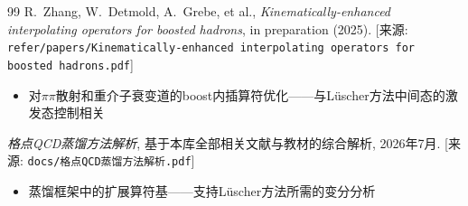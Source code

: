 \documentclass[12pt,a4paper]{ctexart}
\theoremstyle{definition}
\begin{document}
\begin{thebibliography}{99}
R.~Zhang, W.~Detmold, A.~Grebe, et al.,
\textit{Kinematically-enhanced interpolating operators for boosted hadrons},
in preparation (2025).
[来源: \texttt{refer/papers/Kinematically-enhanced interpolating operators for boosted hadrons.pdf}]
\begin{itemize}
    \item 对$\pi\pi$散射和重介子衰变道的boost内插算符优化——与L\"uscher方法中间态的激发态控制相关
\end{itemize}

\textit{格点QCD蒸馏方法解析},
基于本库全部相关文献与教材的综合解析, 2026年7月.
[来源: \texttt{docs/格点QCD蒸馏方法解析.pdf}]
\begin{itemize}
    \item 蒸馏框架中的扩展算符基——支持L\"uscher方法所需的变分分析
\end{itemize}

\end{thebibliography}
\end{document}
